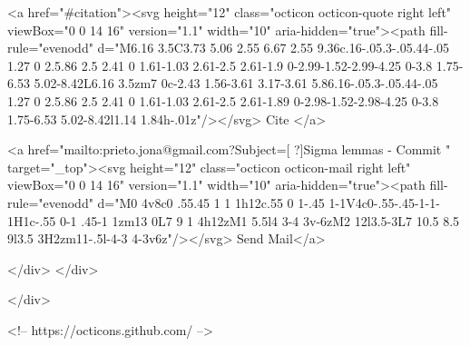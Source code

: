       <a  href="#citation"><svg height="12" class="octicon octicon-quote right left" viewBox="0 0 14 16" version="1.1" width="10" aria-hidden="true"><path fill-rule="evenodd" d="M6.16 3.5C3.73 5.06 2.55 6.67 2.55 9.36c.16-.05.3-.05.44-.05 1.27 0 2.5.86 2.5 2.41 0 1.61-1.03 2.61-2.5 2.61-1.9 0-2.99-1.52-2.99-4.25 0-3.8 1.75-6.53 5.02-8.42L6.16 3.5zm7 0c-2.43 1.56-3.61 3.17-3.61 5.86.16-.05.3-.05.44-.05 1.27 0 2.5.86 2.5 2.41 0 1.61-1.03 2.61-2.5 2.61-1.89 0-2.98-1.52-2.98-4.25 0-3.8 1.75-6.53 5.02-8.42l1.14 1.84h-.01z"/></svg> Cite
      </a>

      <a href="mailto:prieto.jona@gmail.com?Subject=[ ?]Sigma lemmas - Commit " target="_top"><svg height="12" class="octicon octicon-mail right left" viewBox="0 0 14 16" version="1.1" width="10" aria-hidden="true"><path fill-rule="evenodd" d="M0 4v8c0 .55.45 1 1 1h12c.55 0 1-.45 1-1V4c0-.55-.45-1-1-1H1c-.55 0-1 .45-1 1zm13 0L7 9 1 4h12zM1 5.5l4 3-4 3v-6zM2 12l3.5-3L7 10.5 8.5 9l3.5 3H2zm11-.5l-4-3 4-3v6z"/></svg> Send Mail</a>

    </div>
  </div>

</div>

<!-- https://octicons.github.com/ -->





